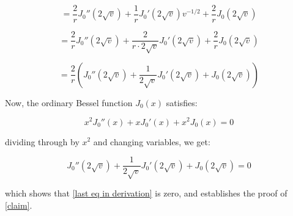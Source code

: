\documentclass{article}
\begin{document}
\begin{equation*}
=\frac{2}{r} J_0''(2\sqrt{v}) + \frac{1}{r} J_0'(2\sqrt{v}) v^{-1/2} + \frac{2}{r} J_0(2\sqrt{v})
\end{equation*}

\begin{equation*}
=\frac{2}{r} J_0''(2\sqrt{v}) + \frac{2}{r\cdot2\sqrt{v}} J_0'(2\sqrt{v}) + \frac{2}{r} J_0(2\sqrt{v})
\end{equation*}

\begin{equation}
\label{last eq in derivation}
=\frac{2}{r} \left( J_0''(2\sqrt{v}) + \frac{1}{2\sqrt{v}} J_0'(2\sqrt{v}) + J_0(2\sqrt{v})\right)
\end{equation}

Now, the ordinary Bessel function $J_0(x)$ satisfies:

\begin{equation*}
x^2 J_0''(x) + xJ_0'(x) + x^2J_0(x) = 0
\end{equation*}

dividing through by $x^2$ and changing variables, we get:

\begin{equation*}
J_0''(2\sqrt{v}) + \frac{1}{2\sqrt{v}}J_0'(2\sqrt{v}) + J_0(2\sqrt{v}) = 0
\end{equation*}

which shows that \eqref{last eq in derivation} is zero, and establishes the proof of \eqref{claim}.
\end{document}
